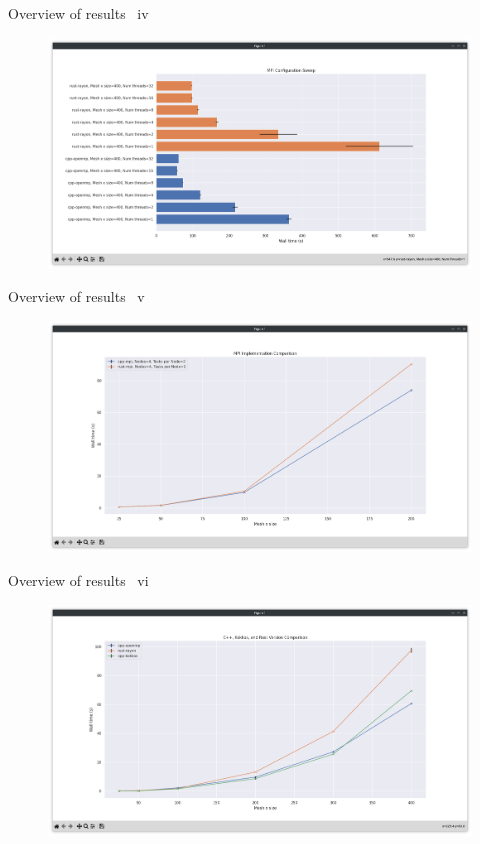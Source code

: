 \documentclass[10pt,aspectratio=169]{beamer}
\begin{document}
\begin{frame}{Overview of results \ iv}
    \begin{figure}[h]
        \centering
        \includegraphics[width=\textwidth]{images/backup_screenshots/parallel_bar.png}
        \label{fig:reference_line}
    \end{figure}
\end{frame}
\begin{frame}{Overview of results \ v}
    \begin{figure}[h]
        \centering
        \includegraphics[width=\textwidth]{images/backup_screenshots/mpi_line.png}
        \label{fig:reference_line}
    \end{figure}
\end{frame}
\begin{frame}{Overview of results \ vi}
    \begin{figure}[h]
        \centering
        \includegraphics[width=\textwidth]{images/backup_screenshots/kokkos_line.png}
        \label{fig:kokkos_line}
    \end{figure}
\end{frame}
\end{document}

